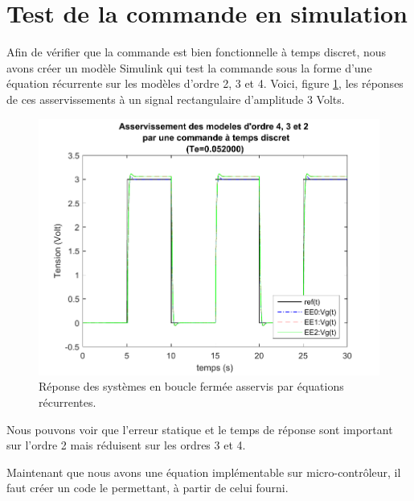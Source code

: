 \section{Test de la commande en simulation}
Afin de vérifier que la commande est bien fonctionnelle à temps discret, nous avons créer un modèle Simulink qui test la commande sous la forme d'une équation récurrente sur les modèles d'ordre 2, 3 et 4. 
Voici, figure \ref{fig:simuER}, les réponses de ces asservissements à un signal rectangulaire d'amplitude 3 Volts.
\begin{figure}[!ht]
\centering
\includegraphics[width=.5\textwidth]{./V/images/AsserTDEqRec.pdf}
\caption{\label{fig:simuER}Réponse des systèmes en boucle fermée asservis par équations récurrentes.}
\end{figure}

Nous pouvons voir que l'erreur statique et le temps de réponse sont important sur l'ordre 2 mais réduisent sur les ordres 3 et 4. 

Maintenant que nous avons une équation implémentable sur micro-contrôleur, il faut créer un code le permettant, à partir de celui fourni.
